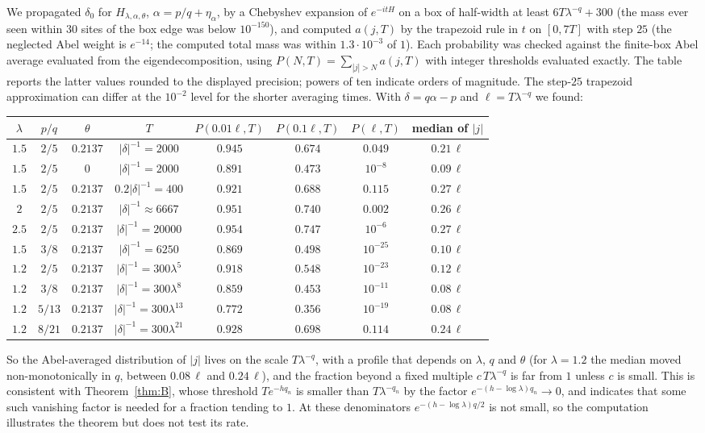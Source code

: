 \begin{remark}\label{rem:fractionnumerics}
We propagated $\delta_0$ for $H_{\lambda,\alpha,\theta}$, $\alpha=p/q+\eta_\alpha$, by a Chebyshev expansion of $e^{-itH}$ on a box of half-width at least $6T\lambda^{-q}+300$ (the mass ever seen within $30$ sites of the box edge was below $10^{-150}$), and computed $a(j,T)$ by the trapezoid rule in $t$ on $[0,7T]$ with step $25$ (the neglected Abel weight is $e^{-14}$; the computed total mass was within $1.3\cdot10^{-3}$ of $1$). Each probability was checked against the finite-box Abel average evaluated from the eigendecomposition, using $P(N,T)=\sum_{|j|>N}a(j,T)$ with integer thresholds evaluated exactly. The table reports the latter values rounded to the displayed precision; powers of ten indicate orders of magnitude. The step-$25$ trapezoid approximation can differ at the $10^{-2}$ level for the shorter averaging times. With $\delta=q\alpha-p$ and $\ell=T\lambda^{-q}$ we found:
\begin{center}
\begin{tabular}{cccccccc}
$\lambda$&$p/q$&$\theta$&$T$&$P(0.01\ell,T)$&$P(0.1\ell,T)$&$P(\ell,T)$&median of $|j|$\\\hline
$1.5$&$2/5$&$0.2137$&$|\delta|^{-1}=2000$&$0.945$&$0.674$&$0.049$&$0.21\,\ell$\\
$1.5$&$2/5$&$0$&$|\delta|^{-1}=2000$&$0.891$&$0.473$&$10^{-8}$&$0.09\,\ell$\\
$1.5$&$2/5$&$0.2137$&$0.2|\delta|^{-1}=400$&$0.921$&$0.688$&$0.115$&$0.27\,\ell$\\
$2$&$2/5$&$0.2137$&$|\delta|^{-1}\approx6667$&$0.951$&$0.740$&$0.002$&$0.26\,\ell$\\
$2.5$&$2/5$&$0.2137$&$|\delta|^{-1}=20000$&$0.954$&$0.747$&$10^{-6}$&$0.27\,\ell$\\
$1.5$&$3/8$&$0.2137$&$|\delta|^{-1}=6250$&$0.869$&$0.498$&$10^{-25}$&$0.10\,\ell$\\
$1.2$&$2/5$&$0.2137$&$|\delta|^{-1}=300\lambda^5$&$0.918$&$0.548$&$10^{-23}$&$0.12\,\ell$\\
$1.2$&$3/8$&$0.2137$&$|\delta|^{-1}=300\lambda^8$&$0.859$&$0.453$&$10^{-11}$&$0.08\,\ell$\\
$1.2$&$5/13$&$0.2137$&$|\delta|^{-1}=300\lambda^{13}$&$0.772$&$0.356$&$10^{-19}$&$0.08\,\ell$\\
$1.2$&$8/21$&$0.2137$&$|\delta|^{-1}=300\lambda^{21}$&$0.928$&$0.698$&$0.114$&$0.24\,\ell$
\end{tabular}
\end{center}
So the Abel-averaged distribution of $|j|$ lives on the scale $T\lambda^{-q}$, with a profile that depends on $\lambda$, $q$ and $\theta$ (for $\lambda=1.2$ the median moved non-monotonically in $q$, between $0.08\,\ell$ and $0.24\,\ell$), and the fraction beyond a fixed multiple $c\,T\lambda^{-q}$ is far from $1$ unless $c$ is small. This is consistent with Theorem~\ref{thm:B}, whose threshold $Te^{-hq_n}$ is smaller than $T\lambda^{-q_n}$ by the factor $e^{-(h-\log\lambda)q_n}\to0$, and indicates that some such vanishing factor is needed for a fraction tending to $1$. At these denominators $e^{-(h-\log\lambda)q/2}$ is not small, so the computation illustrates the theorem but does not test its rate.


\end{remark}
